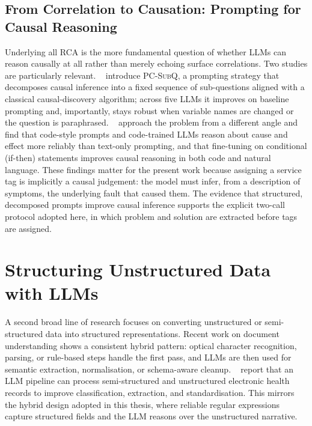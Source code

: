 \subsection{From Correlation to Causation: Prompting for Causal Reasoning}
\label{subsec:rw-causal}
%
Underlying all RCA is the more fundamental question of whether LLMs can reason
causally at all rather than merely echoing surface correlations.  Two studies
are particularly relevant.  \citeauthor{sgouritsa2024prompting}~%
\cite{sgouritsa2024prompting} introduce \textsc{PC-SubQ}, a prompting strategy
that decomposes causal inference into a fixed sequence of sub-questions aligned
with a classical causal-discovery algorithm; across five LLMs it improves on
baseline prompting and, importantly, stays robust when variable names are
changed or the question is paraphrased.  \citeauthor{liu2025eliciting}~%
\cite{liu2025eliciting} approach the problem from a different angle and find
that code-style prompts and code-trained LLMs reason about cause and effect
more reliably than text-only prompting, and that fine-tuning on conditional
(if-then) statements improves causal reasoning in both code and natural
language.  These findings matter for the present work because assigning a
service tag is implicitly a causal judgement: the model must infer, from a
description of symptoms, the underlying fault that caused them.  The evidence
that structured, decomposed prompts improve causal inference supports the
explicit two-call protocol adopted here, in which problem and solution are
extracted before tags are assigned.

\section{Structuring Unstructured Data with LLMs}
\label{sec:rw-struct}
%
A second broad line of research focuses on converting unstructured or
semi-structured data into structured representations.  Recent work on document
understanding shows a consistent hybrid pattern: optical character recognition,
parsing, or rule-based steps handle the first pass, and LLMs are then used for
semantic extraction, normalisation, or schema-aware cleanup.
\citeauthor{stuhlmiller2025scalable}~\cite{stuhlmiller2025scalable} report that
an LLM pipeline can process semi-structured and unstructured electronic health
records to improve classification, extraction, and standardisation.  This
mirrors the hybrid design adopted in this thesis, where reliable regular
expressions capture structured fields and the LLM reasons over the unstructured
narrative.

